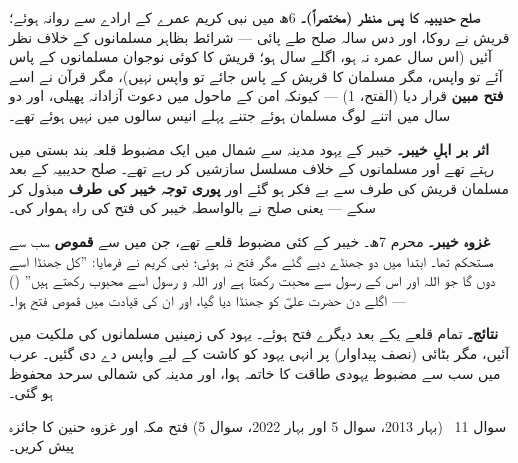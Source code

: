 \begin{hal}
\textbf{صلح حدیبیہ کا پس منظر (مختصراً)۔} \textenglish{6}ھ میں نبی کریم
\saw عمرے کے ارادے سے روانہ ہوئے؛ قریش نے روکا، اور دس سالہ صلح طے پائی ---
شرائط بظاہر مسلمانوں کے خلاف نظر آئیں (اس سال عمرہ نہ ہو، اگلے سال ہو؛
قریش کا کوئی نوجوان مسلمانوں کے پاس آئے تو واپس، مگر مسلمان کا قریش کے
پاس جائے تو واپس نہیں)، مگر قرآن نے اسے \textbf{فتح مبین} قرار دیا (الفتح،
\textenglish{1}) --- کیونکہ امن کے ماحول میں دعوت آزادانہ پھیلی، اور دو
سال میں اتنے لوگ مسلمان ہوئے جتنے پہلے انیس سالوں میں نہیں ہوئے تھے۔

\medskip
\textbf{اثر بر اہلِ خیبر۔} خیبر کے یہود مدینہ سے شمال میں ایک مضبوط قلعہ
بند بستی میں رہتے تھے اور مسلمانوں کے خلاف مسلسل سازشیں کر رہے تھے۔ صلح
حدیبیہ کے بعد مسلمان قریش کی طرف سے بے فکر ہو گئے اور \textbf{پوری توجہ
خیبر کی طرف} مبذول کر سکے --- یعنی صلح نے بالواسطہ خیبر کی فتح کی راہ
ہموار کی۔

\medskip
\textbf{غزوہ خیبر۔} محرم \textenglish{7}ھ۔ خیبر کے کئی مضبوط قلعے تھے،
جن میں سے \textbf{قموص} سب سے مستحکم تھا۔ ابتدا میں دو جھنڈے دیے گئے مگر
فتح نہ ہوئی؛ نبی کریم \saw نے فرمایا: ''کل جھنڈا اسے دوں گا جو اللہ اور
اس کے رسول سے محبت رکھتا ہے اور اللہ و رسول اسے محبوب رکھتے ہیں''
() --- اگلے دن حضرت علیؓ کو جھنڈا دیا گیا، اور
ان کی قیادت میں قموص فتح ہوا۔

\medskip
\textbf{نتائج۔} تمام قلعے یکے بعد دیگرے فتح ہوئے۔ یہود کی زمینیں مسلمانوں
کی ملکیت میں آئیں، مگر بٹائی (نصف پیداوار) پر انہی یہود کو کاشت کے لیے
واپس دے دی گئیں۔ عرب میں سب سے مضبوط یہودی طاقت کا خاتمہ ہوا، اور مدینہ کی
شمالی سرحد محفوظ ہو گئی۔
\end{hal}

\begin{sawal}{سوال \textenglish{11} \ \textnormal{\small(بہار \textenglish{2013}، سوال \textenglish{5} اور بہار \textenglish{2022}، سوال \textenglish{5})}}
فتح مکہ اور غزوہ حنین کا جائزہ پیش کریں۔
\end{sawal}

